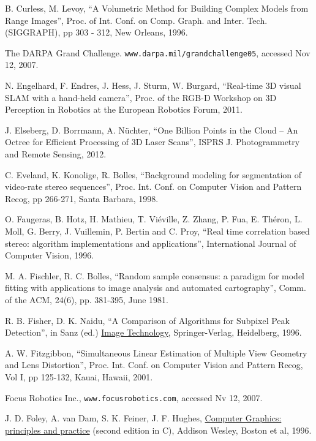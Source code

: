 \documentclass[twocolumn,oneside]{book}
\begin{document}
\begin{thebibliography}{99}
B. Curless, M. Levoy,
``A Volumetric Method for Building Complex Models from Range Images'',
Proc.  of Int. Conf. on Comp. Graph. and Inter. Tech. (SIGGRAPH), pp 303 - 312, New Orleans, 1996.

The DARPA Grand Challenge.
\verb+www.darpa.mil/grandchallenge05+, accessed Nov 12, 2007.

N. Engelhard, F. Endres, J. Hess, J. Sturm, W. Burgard,
``Real-time 3D visual SLAM with a hand-held camera'',
Proc. of the RGB-D Workshop on 3D Perception in Robotics at the
European Robotics Forum, 2011.

J. Elseberg, D. Borrmann, A. N{\"u}chter,
``One Billion Points in the Cloud -- An Octree for Efficient Processing of 3D Laser Scans'',
ISPRS J. Photogrammetry and Remote Sensing, 2012.

C. Eveland, K. Konolige, R. Bolles,
``Background modeling for segmentation of video-rate stereo sequences'',
Proc. Int. Conf. on Computer Vision and Pattern Recog, pp 266-271, Santa Barbara, 1998.

O. Faugeras, B. Hotz, H. Mathieu, T. Vi\'eville, Z. Zhang, P. Fua,
E. Th\'eron, L. Moll, G. Berry, J. Vuillemin, P. Bertin and C. Proy,
``Real time correlation based stereo: algorithm implementations and applications'',
International Journal of Computer Vision, 1996.

M. A. Fischler, R. C. Bolles,
``Random sample consensus: a paradigm for model fitting with applications to
image analysis and automated cartography'',
Comm. of the ACM, 24(6), pp. 381-395, June 1981. 

R. B. Fisher, D. K. Naidu,  
``A Comparison of Algorithms for Subpixel Peak Detection'',
in Sanz (ed.) {\underline {Image Technology}},
Springer-Verlag, Heidelberg, 1996.

A. W. Fitzgibbon,
``Simultaneous Linear Estimation of Multiple View Geometry and Lens Distortion'',
Proc. Int. Conf. on Computer Vision and Pattern Recog, Vol I, pp 125-132, Kauai, Hawaii, 2001.

Focus Robotics Inc.,
\verb+www.focusrobotics.com+, accessed Nv 12, 2007.

J. D. Foley, A. van Dam, S. K. Feiner, J. F. Hughes,
{\underline{Computer Graphics: principles and practice}} (second edition in C),
Addison Wesley, Boston et al, 1996.


\end{thebibliography}
\end{document}
